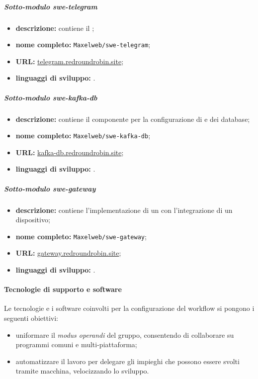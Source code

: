 		\subparagraph{Sotto-modulo swe-telegram}

		\begin{itemize}
		 	\item \textbf{descrizione:} contiene il ;
		 	\item \textbf{nome completo:} \verb!Maxelweb/swe-telegram!;
		 	\item \textbf{URL:} \href{https://github.com/Maxelweb/swe-telegram}{telegram.redroundrobin.site};
		 	\item \textbf{linguaggi di sviluppo:} .
		 \end{itemize}

		\subparagraph{Sotto-modulo swe-kafka-db}

		\begin{itemize}
		 	\item \textbf{descrizione:} contiene il componente per la configurazione di  e dei database;
		 	\item \textbf{nome completo:} \verb!Maxelweb/swe-kafka-db!;
		 	\item \textbf{URL:} \href{https://github.com/Maxelweb/swe-kafka-db}{kafka-db.redroundrobin.site};
		 	\item \textbf{linguaggi di sviluppo:} .
		 \end{itemize}

		 \subparagraph{Sotto-modulo swe-gateway}

		\begin{itemize}
		 	\item \textbf{descrizione:} contiene l'implementazione di un  con l'integrazione di un dispositivo;
		 	\item \textbf{nome completo:} \verb!Maxelweb/swe-gateway!;
		 	\item \textbf{URL:} \href{https://github.com/Maxelweb/swe-gateway}{gateway.redroundrobin.site};
		 	\item \textbf{linguaggi di sviluppo:} .
		 \end{itemize}


	\paragraph{Tecnologie di supporto e software}

	Le tecnologie e i software coinvolti per la configurazione del workflow si pongono i seguenti obiettivi:
	\begin{itemize}
		\item uniformare il \textit{modus operandi} del gruppo, consentendo di collaborare su programmi comuni e multi-piattaforma;
		\item automatizzare il lavoro per delegare gli impieghi che possono essere svolti tramite macchina, velocizzando lo sviluppo.
	\end{itemize}

